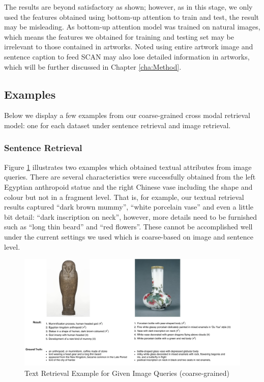 The results are beyond satisfactory as shown; however, as in this stage, we only used the features obtained using bottom-up attention \cite{bottomup} to train and test, the result may be misleading. As bottom-up attention model was trained on natural images, which means the features we obtained for training and testing set may be irrelevant to those contained in artworks. Noted using entire artwork image and sentence caption to feed SCAN may also lose detailed information in artworks, which will be further discussed in Chapter \ref{cha:Method}.

\subsection{Examples}
Below we display a few examples from our coarse-grained cross modal retrieval model: one for each dataset under sentence retrieval and image retrieval.

\subsubsection{Sentence Retrieval}
Figure \ref{fig:scani2t} illustrates two examples which obtained textual attributes from image queries. There are several characteristics were successfully obtained from the left Egyptian anthropoid statue and the right Chinese vase including the shape and colour but not in a fragment level. That is, for example, our textual retrieval results captured ``dark brown mummy'', ``white porcelain vase'' and even a little bit detail: ``dark inscription on neck'', however, more details need to be furnished such as ``long thin beard'' and ``red flowers''. These cannot be accomplished well under the current settings we used which is coarse-based on image and sentence level.

\begin{figure}[h!]
\centering
\includegraphics[width=\textwidth]{scani2t.pdf}
\caption{Text Retrieval Example for Given Image Queries (coarse-grained)}
\label{fig:scani2t}
\end{figure}

